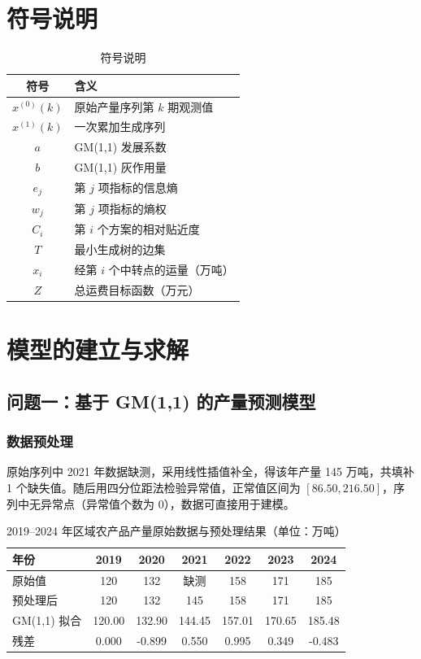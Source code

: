 \documentclass[12pt]{article}
\begin{document}
\section{符号说明}

\begin{table}[htbp]
  \centering
  \caption{符号说明}
  \label{tab:notation}
  \begin{tabular}{cl}
    \toprule
    符号 & 含义 \\
    \midrule
    $x^{(0)}(k)$ & 原始产量序列第 $k$ 期观测值 \\
    $x^{(1)}(k)$ & 一次累加生成序列 \\
    $a$ & GM(1,1) 发展系数 \\
    $b$ & GM(1,1) 灰作用量 \\
    $e_j$ & 第 $j$ 项指标的信息熵 \\
    $w_j$ & 第 $j$ 项指标的熵权 \\
    $C_i$ & 第 $i$ 个方案的相对贴近度 \\
    $T$ & 最小生成树的边集 \\
    $x_i$ & 经第 $i$ 个中转点的运量（万吨） \\
    $Z$ & 总运费目标函数（万元） \\
    \bottomrule
  \end{tabular}
\end{table}

\section{模型的建立与求解}

\subsection{问题一：基于 GM(1,1) 的产量预测模型}

\subsubsection{数据预处理}

原始序列中 2021 年数据缺测，采用线性插值补全，得该年产量 145 万吨，共填补 1 个缺失值。随后用四分位距法检验异常值，正常值区间为 $[86.50, 216.50]$，序列中无异常点（异常值个数为 0），数据可直接用于建模。

\begin{table}[!htbp]
  \centering
  \small
  \caption{2019--2024 年区域农产品产量原始数据与预处理结果（单位：万吨）}
  \label{tab:data}
  \begin{tabular}{lcccccc}
    \toprule
    年份 & 2019 & 2020 & 2021 & 2022 & 2023 & 2024 \\
    \midrule
    原始值 & 120 & 132 & 缺测 & 158 & 171 & 185 \\
    预处理后 & 120 & 132 & 145 & 158 & 171 & 185 \\
    GM(1,1) 拟合 & 120.00 & 132.90 & 144.45 & 157.01 & 170.65 & 185.48 \\
    残差 & 0.000 & -0.899 & 0.550 & 0.995 & 0.349 & -0.483 \\
    \bottomrule
  \end{tabular}
\end{table}
\end{document}
